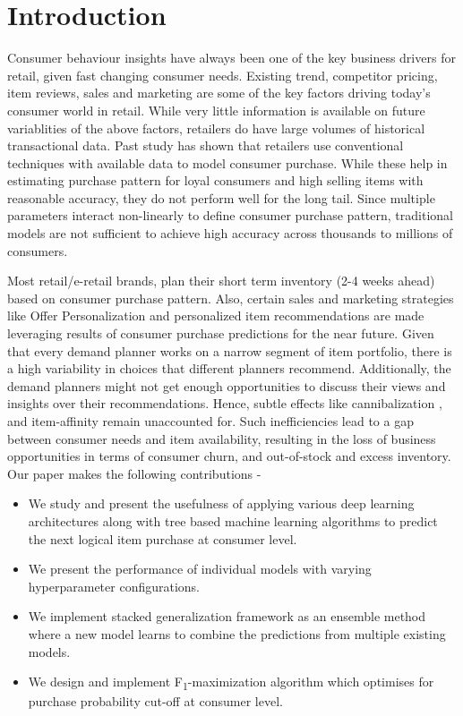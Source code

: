 \section{Introduction}
Consumer behaviour insights have always been one of the key business drivers for retail, given
fast changing consumer needs. Existing trend, competitor pricing, item reviews, sales and marketing are some of the 
key factors driving today's consumer world in retail. While very little information is available
on future variablities of the above factors, retailers do have large volumes of historical transactional data. Past study 
\cite{choudhury2019machine} has shown that retailers use conventional techniques with available data to model consumer purchase. 
While these help in estimating purchase pattern for loyal consumers and high selling items with reasonable accuracy, they 
do not perform well for the long tail. Since multiple parameters interact non-linearly to define consumer purchase pattern,
traditional models are not sufficient to achieve high accuracy across thousands to millions of consumers.

Most retail/e-retail brands, plan their short term inventory (2-4 weeks ahead)  based on consumer 
purchase pattern. Also, certain sales and marketing strategies like Offer Personalization and personalized item
recommendations are made leveraging results of consumer purchase predictions for the near future.
Given that every demand planner works on a narrow segment of item portfolio, there is a high 
variability in choices that different planners recommend. Additionally, the demand planners might not get enough opportunities 
to discuss their views and insights over their recommendations. Hence, subtle effects like cannibalization
\cite{shah2007retailer}, and item-affinity remain unaccounted for. Such inefficiencies lead to a gap between consumer needs 
and item availability, resulting in the loss of business opportunities in terms of consumer churn, and out-of-stock
and excess inventory.
Our paper makes the following contributions -
\begin{itemize}
\item We study and present the usefulness of applying various deep learning architectures along with tree based machine 
learning algorithms to predict the next logical item purchase at consumer level.
\item We present the performance of individual models with varying hyperparameter configurations.
\item We implement stacked generalization framework \cite{wolpert1992stacked} as an ensemble method where a new model learns 
to combine the predictions from multiple existing models.
\item We design and implement F\textsubscript{1}-maximization algorithm which optimises for purchase probability cut-off 
at consumer level.
\end{itemize}